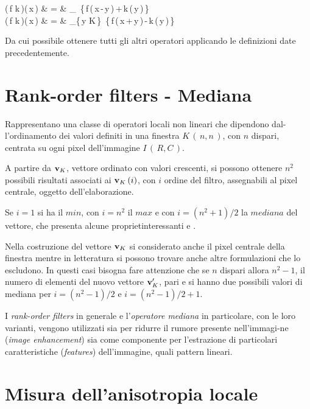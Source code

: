 \beqa
(\,f\,\oplus\,k\,)(\,x\,) & = & \max_{}\,
\{\,f\,(\,x\,-\,y\,)\,+\,k\,(\,y\,)\,\} \\
(\,f\,\ominus\,k\,)(\,x\,) & = & \min_{\{\,y\,\in\,K\,\}}\,
\{\,f\,(\,x\,+\,y\,)\,-\,k\,(\,y\,)\,\} \nonumber
\eeqa

\epr
 
Da cui \e possibile ottenere tutti gli altri operatori applicando le definizioni
date precedentemente.

\section{Rank-order filters - Mediana}

Rappresentano una classe di operatori locali non lineari che dipendono dal-l'ordinamento
dei valori definiti in una finestra $K\,(\,n,n\,)$, con $n$ dispari, centrata su ogni pixel
dell'immagine $I\,(\,R,C\,)$.

A partire da ${\bf v}_K$, vettore ordinato con valori crescenti, si possono ottenere
$n^2$ possibili risultati associati ai ${\bf v}_K\,(i)$, con $i$ ordine del filtro,
assegnabili al pixel centrale, oggetto dell'elaborazione. 

Se $i=1$ si ha il $min$, con $i=n^2$ il $max$ e con $i=(n^2+1)/2$ la
$mediana$ del vettore, che presenta alcune propriet\a interessanti \cite{Zamperoni}
e \cite{Haralick92}.

\boss
Nella costruzione del vettore ${\bf v}_K$ si \e considerato anche il pixel centrale
della finestra mentre in letteratura si possono trovare anche altre formulazioni che lo escludono.
In questi casi bisogna fare attenzione che se $n$ \e dispari allora $n^2-1$, il numero
di elementi del nuovo vettore ${\bf v}_K^\prime$, \e pari e si hanno due possibili valori
di mediana per $i=(n^2-1)/2$ e $i=(n^2-1)/2+1$. 
\eoss

I {\it rank-order filters} in generale e l'{\it operatore mediana} in particolare, con 
le loro varianti, vengono utilizzati sia per ridurre il rumore presente nell'immagi-ne
({\it image enhancement}) sia come componente per l'estrazione di particolari 
caratteristiche ({\it features}) dell'immagine, quali pattern lineari.
 
\section{Misura dell'anisotropia locale}

